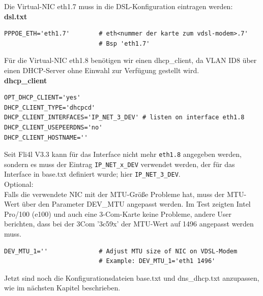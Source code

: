 \noindent Die Virtual-NIC eth1.7 muss in die DSL-Konfiguration eintragen
werden:\\

\noindent \textbf{dsl.txt}

\begin{example}
\begin{verbatim}
PPPOE_ETH='eth1.7'        # eth<nummer der karte zum vdsl-modem>.7'
                          # Bsp 'eth1.7'
\end{verbatim}
\end{example}

\noindent Für die Virtual-NIC eth1.8 benötigen wir einen dhcp\_client, da VLAN
ID8 über einen DHCP-Server ohne Einwahl zur Verfügung gestellt wird.\\

\noindent \textbf{dhcp\_client}

\begin{example}
\begin{verbatim}
OPT_DHCP_CLIENT='yes'
DHCP_CLIENT_TYPE='dhcpcd'
DHCP_CLIENT_INTERFACES='IP_NET_3_DEV' # listen on interface eth1.8
DHCP_CLIENT_USEPEERDNS='no'
DHCP_CLIENT_HOSTNAME=''
\end{verbatim}
\end{example}

Seit Fli4l V3.3 kann für das Interface nicht mehr \texttt{eth1.8} angegeben
werden, sondern es muss der Eintrag \texttt{IP\_NET\_x\_DEV} verwendet werden,
der für das Interface in base.txt definiert wurde; hier
\texttt{IP\_NET\_3\_DEV}.\\

\noindent Optional:\\
Falls die verwendete NIC mit der MTU-Größe Probleme hat, muss der MTU-Wert über
den Parameter DEV\_MTU angepasst werden. Im Test zeigten Intel Pro/100 (e100)
und auch eine 3-Com-Karte keine Probleme, andere User berichten, dass bei der
3Com '3c59x' der MTU-Wert auf 1496 angepasst werden muss.

\begin{example}
\begin{verbatim}
DEV_MTU_1=''              # Adjust MTU size of NIC on VDSL-Modem
                          # Example: DEV_MTU_1='eth1 1496'
\end{verbatim}
\end{example}

Jetzt sind noch die Konfigurationsdateien base.txt und dns\_dhcp.txt anzupassen,
wie im nächsten Kapitel beschrieben.\\


